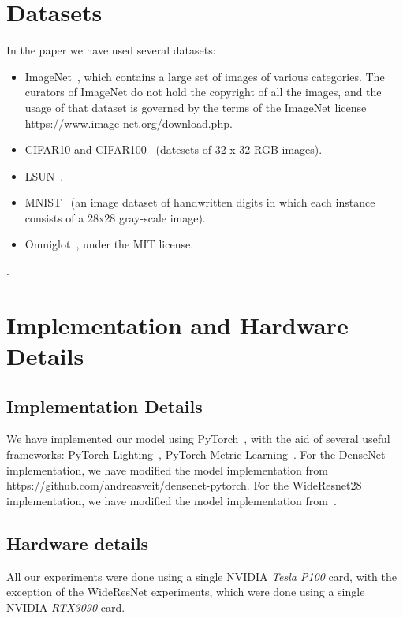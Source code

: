 \documentclass[accepted]{uai2022} %
\begin{document}
\section{Datasets}
In the paper we have used several datasets:
\begin{itemize}
    \item ImageNet~\citep{Deng:CVPR:2009:imagenet}, which contains a large set of images of various categories. The curators of ImageNet do not hold the copyright of all the images,
     and the usage of that dataset is governed by the terms of the ImageNet license https://www.image-net.org/download.php.
     \item CIFAR10 and CIFAR100~\citep{Krizhevsky:Citeseer:2009:Cifar}
     (datesets of  32 x 32 RGB images).
     \item LSUN~\citep{Yu:arxiv:2015:lsun}.
     \item MNIST~\citep{Lecun:1998:mnist} (an image dataset of handwritten digits in which each instance consists of a 28x28 gray-scale image). 
     \item Omniglot~\citep{Lake:Science:2015human}, under the MIT license.
\end{itemize}

. 



\section{Implementation and Hardware Details}
\subsection{Implementation Details}
We have implemented our model using PyTorch~\citep{Paszke:NIPS:2019:Pytorch},
with the aid of several useful frameworks: PyTorch-Lighting~\citep{Falcon:github:2019:pytorch},
PyTorch Metric Learning~\citep{Musgrave:arxiv:2020pytorch}. For the DenseNet~\citep{Huang:2017:densely} implementation,
we have modified the model implementation from https://github.com/andreasveit/densenet-pytorch.
For the WideResnet28~\citep{Zagoruyko:arxiv:2016:wide} implementation, we have modified the model implementation from~\citep{Zaeemzadeh:CVPR:2021:out}.

\subsection{Hardware details}
All our experiments were done using a single NVIDIA \emph{Tesla P100} card, with the exception of the WideResNet experiments, which were done using a single NVIDIA \emph{RTX3090} card.
\end{document}
